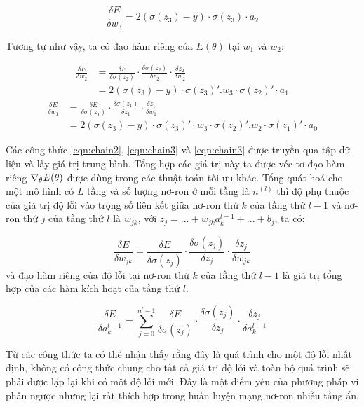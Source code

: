 \begin{equation}
	\label{eqn:chain2}
	\frac{\delta E}{\delta w_3} = 2(\sigma(z_3)-y)\cdot \sigma(z_3)\cdot a_2
\end{equation}

Tương tự như vậy, ta có đạo hàm riêng của $E(\theta)$ tại $w_1$ và $w_2$:

\begin{equation}
	\label{eqn:chain3}
	\begin{split}
		\frac{\delta E}{\delta w_2} &= \frac{\delta E}{\delta \sigma(z_2)}\cdot\frac{\delta \sigma(z_2)}{\delta z_2}\cdot\frac{\delta z_2}{\delta w_2} \\
		&= 2(\sigma(z_3)-y)\cdot \sigma(z_3)'.w_3\cdot\sigma(z_2)'\cdot a_1
	\end{split}
\end{equation}
\begin{equation}
	\label{eqn:chain4}
	\begin{split}
		\frac{\delta E}{\delta w_1} &= \frac{\delta E}{\delta \sigma(z_1)}\cdot\frac{\delta \sigma(z_1)}{\delta z_1}\cdot\frac{\delta z_1}{\delta w_1} \\
		&= 2(\sigma(z_3)-y)\cdot \sigma(z_3)'\cdot w_3\cdot\sigma(z_2)'.w_2\cdot\sigma(z_1)'\cdot a_0
	\end{split}
\end{equation}

Các công thức \ref{eqn:chain2}, \ref{eqn:chain3} và \ref{eqn:chain3} được truyền qua tập dữ liệu và lấy giá trị trung bình. Tổng hợp các giá trị này ta được véc-tơ đạo hàm riêng $\nabla_\theta \mathbf{\it{E}(\theta)}$ được dùng trong các thuật toán tối ưu khác. Tổng quát hoá cho một mô hình có $L$ tầng và số lượng nơ-ron ở mỗi tầng là $n^{(l)}$ thì độ phụ thuộc của giá trị độ lỗi vào trọng số liên kết giữa nơ-ron thứ $k$ của tầng thứ $l-1$ và nơ-ron thứ $j$ của tầng thứ $l$ là $w_{jk}$, với $z_j = ...+w_{jk}a^{l-1}_k+... + b_j$, ta có:

\begin{equation}
	\label{eqn:chain5}
	\frac{\delta E}{\delta w_{jk}} = \frac{\delta E}{\delta \sigma(z_j)} \cdot\frac{\delta \sigma(z_j)}{\delta z_j}\cdot\frac{\delta z_j}{\delta w_{jk}}
\end{equation}
và đạo hàm riêng của độ lỗi tại nơ-ron thứ $k$ của tầng thứ $l - 1$ là giá trị tổng hợp của các hàm kích hoạt của tầng thứ $l$.

\begin{equation}
	\label{eqn:chain6}
	\frac{\delta E}{\delta a_k^{l-1}} = \sum_{j=0}^{n^{l}-1}\frac{\delta E}{\delta \sigma(z_j)}\cdot\frac{\delta \sigma(z_j)}{\delta z_j}\cdot\frac{\delta z_j}{\delta a_k^{l-1}}
\end{equation}

Từ các công thức ta có thể nhận thấy rằng đây là quá trình cho một độ lỗi nhất định, không có công thức chung cho tất cả giá trị độ lỗi và toàn bộ quá trình sẽ phải được lặp lại khi có một độ lỗi mới. Đây là một điểm yếu của phương pháp vi phân ngược nhưng lại rất thích hợp trong huấn luyện mạng nơ-ron nhiều tầng ẩn.